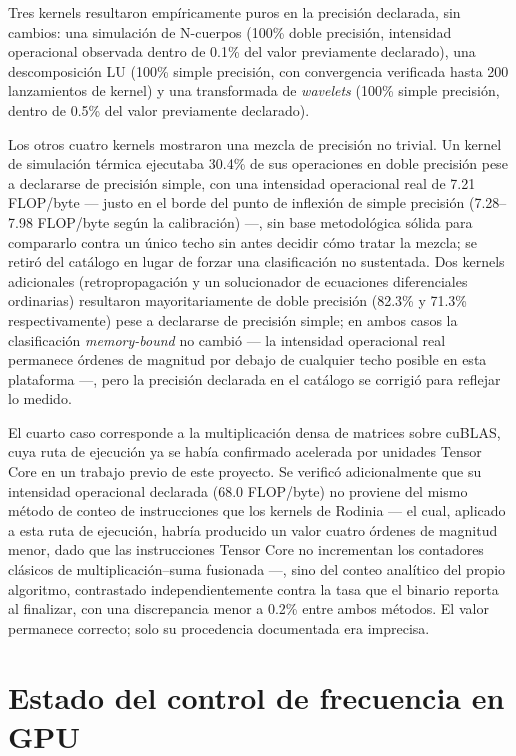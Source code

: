 \documentclass[12pt,oneside,spanish]{book}
\begin{document}
Tres kernels resultaron empíricamente puros en la precisión declarada, sin cambios: una simulación de N-cuerpos (100\% doble precisión, intensidad operacional observada dentro de 0.1\% del valor previamente declarado), una descomposición LU (100\% simple precisión, con convergencia verificada hasta 200 lanzamientos de kernel) y una transformada de \textit{wavelets} (100\% simple precisión, dentro de 0.5\% del valor previamente declarado).

Los otros cuatro kernels mostraron una mezcla de precisión no trivial. Un kernel de simulación térmica ejecutaba 30.4\% de sus operaciones en doble precisión pese a declararse de precisión simple, con una intensidad operacional real de 7.21 FLOP/byte --- justo en el borde del punto de inflexión de simple precisión (7.28--7.98 FLOP/byte según la calibración) ---, sin base metodológica sólida para compararlo contra un único techo sin antes decidir cómo tratar la mezcla; se retiró del catálogo en lugar de forzar una clasificación no sustentada. Dos kernels adicionales (retropropagación y un solucionador de ecuaciones diferenciales ordinarias) resultaron mayoritariamente de doble precisión (82.3\% y 71.3\% respectivamente) pese a declararse de precisión simple; en ambos casos la clasificación \textit{memory-bound} no cambió --- la intensidad operacional real permanece órdenes de magnitud por debajo de cualquier techo posible en esta plataforma ---, pero la precisión declarada en el catálogo se corrigió para reflejar lo medido.

El cuarto caso corresponde a la multiplicación densa de matrices sobre cuBLAS, cuya ruta de ejecución ya se había confirmado acelerada por unidades Tensor Core en un trabajo previo de este proyecto. Se verificó adicionalmente que su intensidad operacional declarada (68.0 FLOP/byte) no proviene del mismo método de conteo de instrucciones que los kernels de Rodinia --- el cual, aplicado a esta ruta de ejecución, habría producido un valor cuatro órdenes de magnitud menor, dado que las instrucciones Tensor Core no incrementan los contadores clásicos de multiplicación--suma fusionada ---, sino del conteo analítico del propio algoritmo, contrastado independientemente contra la tasa que el binario reporta al finalizar, con una discrepancia menor a 0.2\% entre ambos métodos. El valor permanece correcto; solo su procedencia documentada era imprecisa.

\section{Estado del control de frecuencia en GPU}
\label{sec:resultados-gpu-dvfs}
\end{document}
